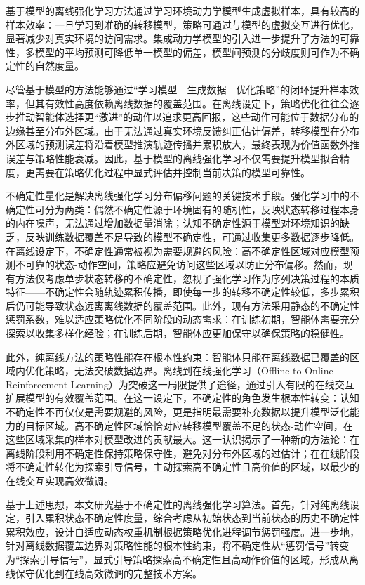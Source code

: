 基于模型的离线强化学习方法通过学习环境动力学模型生成虚拟样本，具有较高的样本效率：一旦学习到准确的转移模型，策略可通过与模型的虚拟交互进行优化，显著减少对真实环境的访问需求。集成动力学模型\cite{Lakshminarayanan2017Ensemble}的引入进一步提升了方法的可靠性，多模型的平均预测可降低单一模型的偏差，模型间预测的分歧度则可作为不确定性的自然度量。

尽管基于模型的方法能够通过“学习模型—生成数据—优化策略”的闭环提升样本效率，但其有效性高度依赖离线数据的覆盖范围。在离线设定下，策略优化往往会逐步推动智能体选择更“激进”的动作以追求更高回报，这些动作可能位于数据分布的边缘甚至分布外区域。由于无法通过真实环境反馈纠正估计偏差，转移模型在分布外区域的预测误差将沿着模型推演轨迹传播并累积放大，最终表现为价值函数外推误差与策略性能衰减。因此，基于模型的离线强化学习不仅需要提升模型拟合精度，更需要在策略优化过程中显式评估并控制当前决策的模型可靠性。

不确定性量化是解决离线强化学习分布偏移问题的关键技术手段。强化学习中的不确定性可分为两类\cite{Charpentier2022Uncertainty}：偶然不确定性源于环境固有的随机性，反映状态转移过程本身的内在噪声，无法通过增加数据量消除；认知不确定性源于模型对环境知识的缺乏，反映训练数据覆盖不足导致的模型不确定性，可通过收集更多数据逐步降低。在离线设定下，不确定性通常被视为需要规避的风险：高不确定性区域对应模型预测不可靠的状态-动作空间，策略应避免访问这些区域以防止分布偏移。然而，现有方法仅考虑单步状态转移的不确定性，忽视了强化学习作为序列决策过程的本质特征——不确定性会随轨迹累积传播，即使每一步的转移不确定性较低，多步累积后仍可能导致状态远离离线数据的覆盖范围。此外，现有方法采用静态的不确定性惩罚系数，难以适应策略优化不同阶段的动态需求：在训练初期，智能体需要充分探索以收集多样化经验；在训练后期，智能体应更加保守以确保策略的稳健性。

此外，纯离线方法的策略性能存在根本性约束：智能体只能在离线数据已覆盖的区域内优化策略，无法突破数据边界。离线到在线强化学习（Offline-to-Online Reinforcement Learning）为突破这一局限提供了途径，通过引入有限的在线交互扩展模型的有效覆盖范围。在这一设定下，不确定性的角色发生根本性转变：认知不确定性不再仅仅是需要规避的风险，更是指明最需要补充数据以提升模型泛化能力的目标区域。高不确定性区域恰恰对应转移模型覆盖不足的状态-动作空间，在这些区域采集的样本对模型改进的贡献最大。这一认识揭示了一种新的方法论：在离线阶段利用不确定性保持策略保守性，避免对分布外区域的过估计；在在线阶段将不确定性转化为探索引导信号，主动探索高不确定性且高价值的区域，以最少的在线交互实现高效微调。

基于上述思想，本文研究基于不确定性的离线强化学习算法。首先，针对纯离线设定，引入累积状态不确定性度量，综合考虑从初始状态到当前状态的历史不确定性累积效应，设计自适应动态权重机制根据策略优化进程调节惩罚强度。进一步地，针对离线数据覆盖边界对策略性能的根本性约束，将不确定性从“惩罚信号”转变为“探索引导信号”，显式引导策略探索高不确定性且高动作价值的区域，形成从离线保守优化到在线高效微调的完整技术方案。


